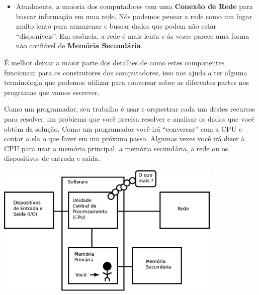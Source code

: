 \begin{itemize}
\item Atualmente, a maioria dos computadores tem uma
{\bf Conexão de Rede} para buscar informação em uma rede.
Nós podemos pensar a rede como um lugar muito lento para armazenar
e buscar dados que podem não estar ``disponíveis''. Em essência,
a rede é mais lenta e às vezes parece uma forma não confiável de
{\bf Memória Secundária}.
%

\end{itemize}
%

É melhor deixar a maior parte dos detalhes de como estes componentes funcionam para
os construtores dos computadores, isso nos ajuda a ter alguma terminologia
que podemos utilizar para conversar sobre as diferentes partes nos programas
que vamos escrever.
%

Como um programador, seu trabalho é usar e orquestrar
cada um destes recursos para resolver um problema que você precisa resolver
e analisar os dados que você obtém da solução. Como um programador você irá
``conversar'' com a CPU e contar a ela o que fazer em um próximo passo.
Algumas vezes você irá dizer à CPU para usar a memória principal, a memória
secundária, a rede ou os dispositivos de entrada e saída.
%

\beforefig
\centerline{\includegraphics[height=2.50in]{figs2/arch2.eps}}
\afterfig
%


